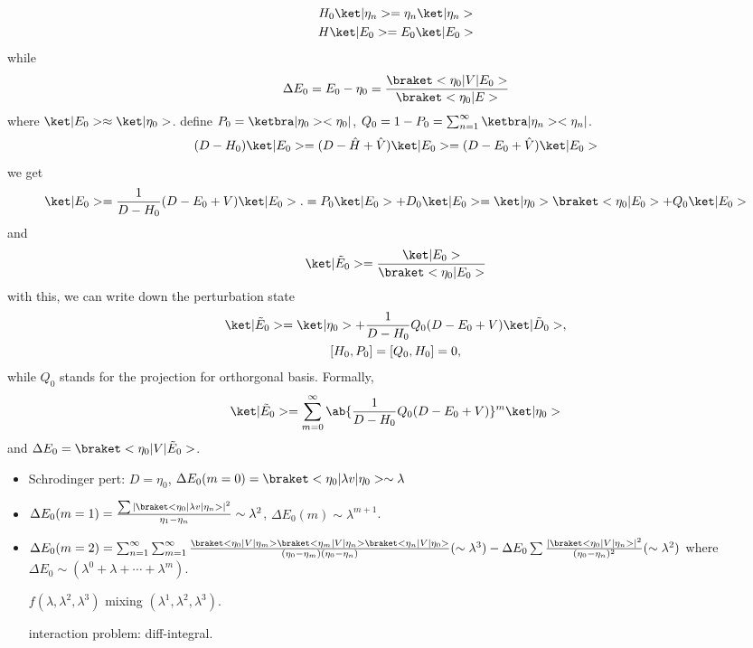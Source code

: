 \begin{gather}
  H_0 \ket|\eta_n> = \eta_n \ket|\eta_n>\\
  H\ket|E_0> = E_0 \ket|E_0>
\end{gather}
while
\[
  \Delta E_0 = E_0 - \eta_0 = \frac{\braket<\eta_0|V|E_0>}{\braket<\eta_0|E>}
\]
where $\ket|E_0> \approx \ket|\eta_0>$.
define $P_0 = \ketbra|\eta_0><\eta_0|$, $Q_0 = 1 - P_0 = \sum_{n=1}^\infty \ketbra|\eta_n><\eta_n|$.
\[
  (D - H_0)\ket|E_0> = (D - \hat H + \hat V) \ket|E_0> = (D - E_0 + \hat V) \ket|E_0>
\]
we get
\begin{equation}
  \ket|E_0> = \frac1{D - H_0} (D - E_0 + V) \ket|E_0>.
= P_0 \ket|E_0> + D_0 \ket|E_0> = \ket|\eta_0>\braket<\eta_0|E_0> + Q_0 \ket|E_0>
\end{equation}
and
\[
  \ket|\tilde E_0> = \frac{\ket|E_0>}{\braket<\eta_0|E_0>}
\]
with this, we can write down the perturbation state
\begin{gather}
  \ket|\tilde E_0> = \ket|\eta_0> + \frac{1}{D - H_0} Q_0 (D - E_0 + V) \ket|\tilde D_0>,\\
  [H_0, P_0] = [Q_0, H_0] = 0,
\end{gather}
while $Q_0$ stands for the projection for orthorgonal basis.
Formally,
\begin{equation}
  \ket|\tilde E_0> = \sum_{m=0}^\infty\ab\{
    \frac{1}{D - H_0} Q_0 (D - E_0 + V)
  \}^m \ket|\eta_0>
\end{equation}
and $\Delta E_0 = \braket<\eta_0|V|\tilde E_0>$.
\begin{itemize}
  \item Schrodinger pert: $D = \eta_0$, $\Delta E_0 (m = 0) = \braket<\eta_0|\lambda v|\eta_0> \sim \lambda$
  \item $\Delta E_0(m = 1) = \frac{\sum|\braket<\eta_0|\lambda v|\eta_n>|^2}{\eta_1 - \eta_n} \sim \lambda^2$, $\Delta E_0(m) \sim \lambda^{m + 1}$.
  \item $\Delta E_0(m = 2) = \sum_{n=1}^\infty \sum_{m=1}^\infty
  \frac{\braket<\eta_0|V|\eta_m> \braket<\eta_m|V|\eta_n>\braket<\eta_n|V|\eta_0>}{(\eta_0 - \eta_m)(\eta_0 - \eta_n)} (\sim \lambda^3)
  - \Delta E_0 \sum\frac{|\braket<\eta_0|V|\eta_n>|^2}{(\eta_0 - \eta_n)^2} (\sim \lambda^2)$
  where $\Delta E_0 \sim (\lambda^0 + \lambda + \cdots + \lambda^m)$.

  $f(\lambda,\lambda^2, \lambda^3)$ mixing $(\lambda^1, \lambda^2, \lambda^3)$.

  interaction problem: diff-integral.
\end{itemize}

